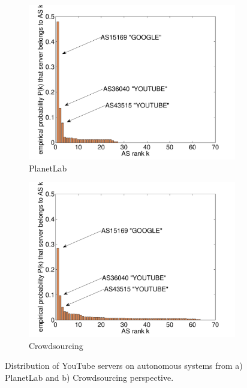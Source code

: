\begin{figure}[bt]
    \centering
	\begin{subfigure}[t]{0.49\textwidth}
	\includegraphics[width=\textwidth]{aslevel/crowd/results/figs/valli_AS_pl_dst.pdf}
  \caption{PlanetLab}
	\label{fig:AS_pl_dst}
  \end{subfigure}
	\begin{subfigure}[t]{0.49\textwidth}
	\includegraphics[width=\textwidth]{aslevel/crowd/results/figs/valli_AS_mw_dst.pdf}
  \caption{Crowdsourcing}
 	\label{fig:AS_mw_dst}
  \end{subfigure}
    \caption{Distribution of YouTube servers on autonomous systems from a) PlanetLab and b) Crowdsourcing perspective.}
    \label{fig:AS_dst}
\end{figure}

